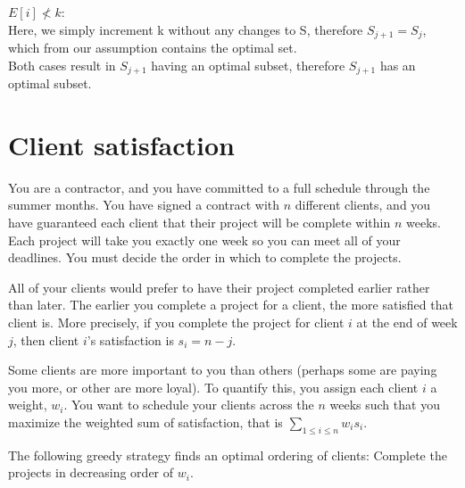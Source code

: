 \documentclass[11pt]{article}
\begin{document}
\begin{enumerate}
\begin{soln}
    $E[i] \nless k$:\\
    Here, we simply increment k without any changes to S, therefore $S_{j+1} = S_j$, which from our assumption contains the optimal set. \\
    
    Both cases result in $S_{j+1}$ having an optimal subset, therefore $S_{j+1}$ has an optimal subset.
    \end{soln}
    
\end{enumerate}

\clearpage

\section{Client satisfaction}

You are a contractor, and you have committed to a full schedule through the summer months. You have signed a contract with $n$ different clients, and you have guaranteed each client that their project will be complete within $n$ weeks. Each project will take you exactly one week so you can meet all of your deadlines. You must decide the order in which to complete the projects. 

All of your clients would prefer to have their project completed earlier rather than later. The earlier you complete a project for a client, the more satisfied that client is. More precisely, if you complete the project for client $i$ at the end of week $j$, then client $i$'s satisfaction is $s_i = n - j$.

Some clients are more important to you than others (perhaps some are paying you more, or other are more loyal). To quantify this, you assign each client $i$ a weight, $w_i$. You want to schedule your clients across the $n$ weeks such that you maximize the weighted sum of satisfaction, that is $\sum_{1 \le i \le n} w_i s_i$.

The following greedy strategy finds an optimal ordering of clients:
Complete the projects in decreasing order of $w_i$.
\end{document}
